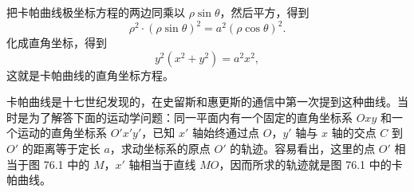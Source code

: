 把卡帕曲线极坐标方程的两边同乘以 $\rho\sin\theta$，然后平方，得到
\[
  \rho^2\cdot(\rho\sin\theta)^2 = a^2(\rho\cos\theta)^2.
\]
化成直角坐标，得到
\[
  y^2(x^2+y^2) = a^2x^2,
\]
这就是卡帕曲线的直角坐标方程。

卡帕曲线是十七世纪发现的，在史留斯和惠更斯的通信中第一次提到这种曲线。当时是为了解答下面的运动学问题：同一平面内有一个固定的直角坐标系 $Oxy$ 和一个运动的直角坐标系 $O'x'y'$，已知 $x'$ 轴始终通过点 $O$，$y'$ 轴与 $x$ 轴的交点 $C$ 到 $O'$ 的距离等于定长 $a$，求动坐标系的原点 $O'$ 的轨迹。容易看出，这里的点 $O'$ 相当于图 76.1 中的 $M$，$x'$ 轴相当于直线 $MO$，因而所求的轨迹就是图 76.1 中的卡帕曲线。
